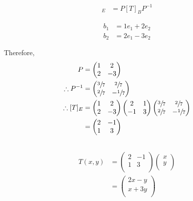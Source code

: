 \documentclass[fleqn, a4paper]{amsart}
\theoremstyle{definition}
\theoremstyle{theorem}
\theoremstyle{remark}
\numberwithin{corollary}{theorem}
\numberwithin{equation}{theorem}
\begin{document}
\begin{multicols}{1}
\begin{align*}
	[T]_E &= P [T]_B P^{-1}
\end{align*}

\begin{align*}
	b_1 &= 1 e_1 + 2 e_2\\
	b_2 &= 2 e_1 - 3 e_2
\end{align*}

Therefore,
\begin{align*}
	P &= 
		\begin{pmatrix}
			1 & 2\\
			2 & -3\\
		\end{pmatrix}\\
	\therefore P^{-1} &= 
		\begin{pmatrix}
			\sfrac{3}{7} & \sfrac{2}{7}\\
			\sfrac{2}{7} & -\sfrac{1}{7}\\
		\end{pmatrix}\\
	\therefore [T]_E &= 
		\begin{pmatrix}
			1 & 2\\
			2 & -3\\
		\end{pmatrix}
		\begin{pmatrix}
			2 & 1\\
			-1 & 3\\
		\end{pmatrix}
		\begin{pmatrix}
			\sfrac{3}{7} & \sfrac{2}{7}\\
			\sfrac{2}{7} & -\sfrac{1}{7}\\
		\end{pmatrix}\\
	&= 
		\begin{pmatrix}
			2 & -1\\
			1 & 3\\
		\end{pmatrix}
\end{align*}

\subsection{}

\begin{align*}
	T(x, y) &= 
		\begin{pmatrix}
			2 & -1\\
			1 & 3\\
		\end{pmatrix}
		\begin{pmatrix}
			x\\
			y\\
		\end{pmatrix}\\
	&=
	\begin{pmatrix}
		2x - y\\
		x + 3y\\
	\end{pmatrix}
\end{align*}


\end{multicols}
\end{document}
